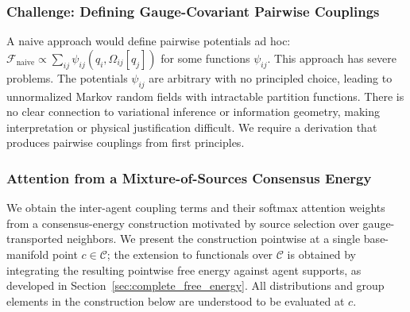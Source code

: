 \documentclass[11pt]{article}
\begin{document}
\subsubsection{Challenge: Defining Gauge-Covariant Pairwise Couplings}

A naive approach would define pairwise potentials ad hoc: $\mathcal{F}_{\text{naive}} \propto \sum_{ij} \psi_{ij}(q_i, \Omega_{ij}[q_j])$ for some functions $\psi_{ij}$. This approach has severe problems. The potentials $\psi_{ij}$ are arbitrary with no principled choice, leading to unnormalized Markov random fields with intractable partition functions. There is no clear connection to variational inference or information geometry, making interpretation or physical justification difficult. We require a derivation that produces pairwise couplings from first principles.

\subsubsection{Attention from a Mixture-of-Sources Consensus Energy}
\label{sec:mixture_derivation}

We obtain the inter-agent coupling terms and their softmax attention weights from a consensus-energy construction motivated by source selection over gauge-transported neighbors. We present the construction pointwise at a single base-manifold point $c \in \mathcal{C}$; the extension to functionals over $\mathcal{C}$ is obtained by integrating the resulting pointwise free energy against agent supports, as developed in Section~\ref{sec:complete_free_energy}. All distributions and group elements in the construction below are understood to be evaluated at $c$.
\end{document}
